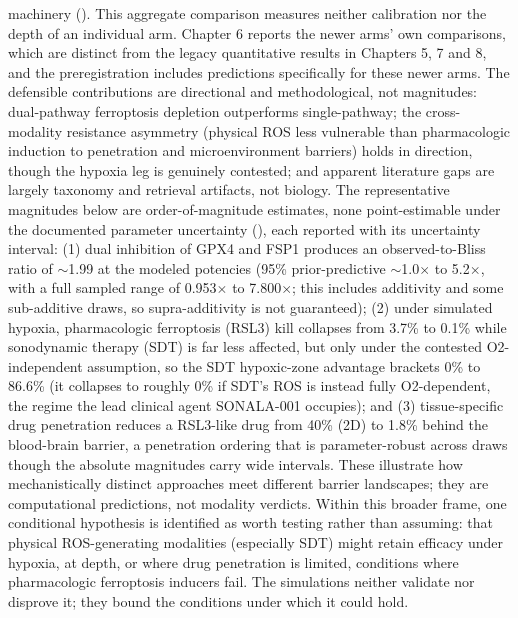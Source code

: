 \documentclass[11pt,twoside,openright]{report}
\begin{document}
machinery (). This aggregate comparison measures neither calibration nor the depth of an individual arm. Chapter 6 reports the newer arms' own comparisons, which are distinct from the legacy quantitative results in Chapters 5, 7 and 8, and the preregistration includes predictions specifically for these newer arms. The defensible contributions are directional and methodological, not magnitudes: dual-pathway ferroptosis depletion outperforms single-pathway; the cross-modality resistance asymmetry (physical ROS less vulnerable than pharmacologic induction to penetration and microenvironment barriers) holds in direction, though the hypoxia leg is genuinely contested; and apparent literature gaps are largely taxonomy and retrieval artifacts, not biology. The representative magnitudes below are order-of-magnitude estimates, none point-estimable under the documented parameter uncertainty (), each reported with its uncertainty interval: (1) dual inhibition of GPX4 and FSP1 produces an observed-to-Bliss ratio of $\sim$1.99 at the modeled potencies (95\% prior-predictive $\sim$1.0$\times$ to 5.2$\times$, with a full sampled range of 0.953$\times$ to 7.800$\times$; this includes additivity and some sub-additive draws, so supra-additivity is not guaranteed); (2) under simulated hypoxia, pharmacologic ferroptosis (RSL3) kill collapses from 3.7\% to 0.1\% while sonodynamic therapy (SDT) is far less affected, but only under the contested O2-independent assumption, so the SDT hypoxic-zone advantage brackets 0\% to 86.6\% (it collapses to roughly 0\% if SDT's ROS is instead fully O2-dependent, the regime the lead clinical agent SONALA-001 occupies); and (3) tissue-specific drug penetration reduces a RSL3-like drug from 40\% (2D) to 1.8\% behind the blood-brain barrier, a penetration ordering that is parameter-robust across draws though the absolute magnitudes carry wide intervals. These illustrate how mechanistically distinct approaches meet different barrier landscapes; they are computational predictions, not modality verdicts. Within this broader frame, one conditional hypothesis is identified as worth testing rather than assuming: that physical ROS-generating modalities (especially SDT) might retain efficacy under hypoxia, at depth, or where drug penetration is limited, conditions where pharmacologic ferroptosis inducers fail. The simulations neither validate nor disprove it; they bound the conditions under which it could hold.
\end{document}
